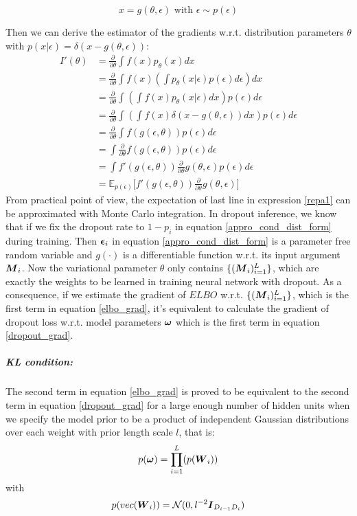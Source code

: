 \[
x = g(\theta, \epsilon)  \text{ with } \epsilon \sim p(\epsilon)
\]

Then we can derive the estimator of the gradients w.r.t. distribution parameters $\theta$ with $p(x|\epsilon) = \delta(x-g(\theta,\epsilon))$:
\begin{equation}
\begin{aligned} \label{repa1}
I'(\theta) &= \frac{\partial}{\partial \theta} \int f(x) p_{\theta}(x) dx \\
&= \frac{\partial}{\partial \theta} \int f(x)(\int p_{\theta}(x|\epsilon)p(\epsilon)d\epsilon) dx \\
&= \frac{\partial}{\partial \theta} \int (\int f(x) p_{\theta}(x|\epsilon)dx) p(\epsilon) d\epsilon \\
&= \frac{\partial}{\partial \theta} \int (\int f(x)\delta(x-g(\theta,\epsilon))dx) p(\epsilon) d\epsilon \\ 
&= \frac{\partial}{\partial \theta} \int f(g(\epsilon, \theta)) p(\epsilon) d\epsilon \\
&= \int \frac{\partial}{\partial \theta} f(g(\epsilon, \theta)) p(\epsilon) d\epsilon \\
&= \int f'(g(\epsilon, \theta))\frac{\partial}{\partial \theta}g(\theta, \epsilon) p(\epsilon) d\epsilon \\
&= \mathbb E_{p(\epsilon)}\big[ f'(g(\epsilon, \theta))\frac{\partial}{\partial \theta}g(\theta, \epsilon)\big] 
\end{aligned}
\end{equation} 
From practical point of view, the expectation of last line in expression \ref{repa1} can be approximated with Monte Carlo integration. In dropout inference, we know that if we fix the dropout rate to $1- p_{i}$ in equation \ref{appro_cond_dist_form} during training. Then $\boldsymbol \epsilon_{i}$ in equation \ref{appro_cond_dist_form} is a parameter free random variable and $g(\cdot)$ is a differentiable function w.r.t. its input argument $\boldsymbol M_{i}$. Now the variational parameter $\theta$ only contains $\{(\boldsymbol M_{i})_{i=1}^{L} \}$, which are exactly the weights to be learned in training neural network with dropout. As a consequence, if we estimate the gradient of $ELBO$ w.r.t. $\{(\boldsymbol M_{i})_{i=1}^{L}\}$, which is the first term in equation \ref{elbo_grad}, it's equivalent to calculate the gradient of dropout loss w.r.t. model parameters $\boldsymbol \omega$ which is the first term in equation \ref{dropout_grad}.

\subparagraph{KL condition:} The second term in equation \ref{elbo_grad} is proved to be equivalent to the second term in equation \ref{dropout_grad}
for a large enough number of hidden units when we specify the model prior to be a product of independent Gaussian distributions over each weight with prior length scale $l$, that is:
\[p(\boldsymbol \omega) = \prod_{i=1}^{L}(p(\boldsymbol W_{i})) \]
with
\[
p(vec(\boldsymbol W_{i})) = \mathcal N(0, l^{-2}\boldsymbol I_{D_{i-1} D_{i}})
\]

